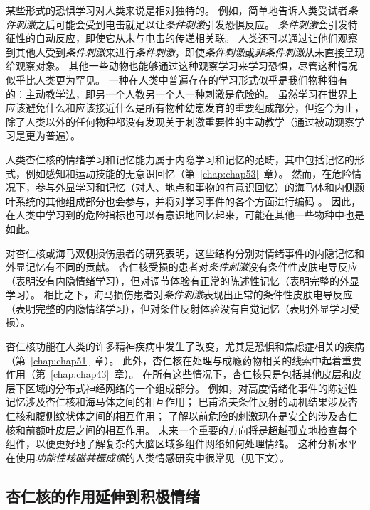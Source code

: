 某些形式的恐惧学习对人类来说是相对独特的。
例如，简单地告诉人类受试者\textit{条件刺激}之后可能会受到电击就足以让\textit{条件刺激}引发恐惧反应。
\textit{条件刺激}会引发特征性的自动反应，即使它从未与电击的传递相关联。
人类还可以通过让他们观察到其他人受到\textit{条件刺激}来进行\textit{条件刺激}，即使\textit{条件刺激}或\textit{非条件刺激}从未直接呈现给观察对象。
其他一些动物也能够通过这种观察学习来学习恐惧，尽管这种情况似乎比人类更为罕见。
一种在人类中普遍存在的学习形式似乎是我们物种独有的：主动教学法，即另一个人教另一个人一种刺激是危险的。
虽然学习在世界上应该避免什么和应该接近什么是所有物种幼崽发育的重要组成部分，但迄今为止，除了人类以外的任何物种都没有发现关于刺激重要性的主动教学（通过被动观察学习是更为普遍）。


人类杏仁核的情绪学习和记忆能力属于内隐学习和记忆的范畴，其中包括记忆的形式，例如感知和运动技能的无意识回忆（第~\ref{chap:chap53}~章）。
然而，在危险情况下，参与外显学习和记忆（对人、地点和事物的有意识回忆）的海马体和内侧颞叶系统的其他组成部分也会参与，并将对学习事件的各个方面进行编码 。
因此，在人类中学习到的危险指标也可以有意识地回忆起来，可能在其他一些物种中也是如此。


对杏仁核或海马双侧损伤患者的研究表明，这些结构分别对情绪事件的内隐记忆和外显记忆有不同的贡献。
杏仁核受损的患者对\textit{条件刺激}没有条件性皮肤电导反应（表明没有内隐情绪学习），但对调节体验有正常的陈述性记忆（表明完整的外显学习）。
相比之下，海马损伤患者对\textit{条件刺激}表现出正常的条件性皮肤电导反应（表明完整的内隐情绪学习），但对条件反射体验没有自觉记忆（表明外显学习受损）。


杏仁核功能在人类的许多精神疾病中发生了改变，尤其是恐惧和焦虑症相关的疾病（第~\ref{chap:chap51}~章）。
此外，杏仁核在处理与成瘾药物相关的线索中起着重要作用（第~\ref{chap:chap43}~章）。
在所有这些情况下，杏仁核只是包括其他皮层和皮层下区域的分布式神经网络的一个组成部分。
例如，对高度情绪化事件的陈述性记忆涉及杏仁核和海马体之间的相互作用；
巴甫洛夫条件反射的动机结果涉及杏仁核和腹侧纹状体之间的相互作用；
了解以前危险的刺激现在是安全的涉及杏仁核和前额叶皮层之间的相互作用。
未来一个重要的方向将是超越孤立地检查每个组件，以便更好地了解复杂的大脑区域多组件网络如何处理情绪。
这种分析水平在使用\textit{功能性核磁共振成像}的人类情感研究中很常见（见下文）。



\subsection{杏仁核的作用延伸到积极情绪}


